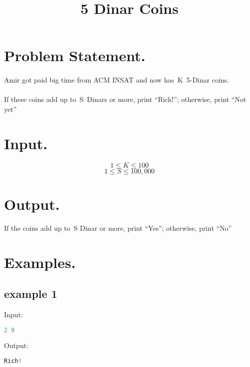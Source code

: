 \documentclass[10pt]{article}
\begin{document}
\title{5 Dinar Coins}
 \date{}
\maketitle
\section{Problem Statement.}
\paragraph{}
Amir got paid big time from ACM INSAT and now has K 5-Dinar coins.
\paragraph{}
If these coins add up to S Dinars or more, print “Rich!”; otherwise, print “Not yet”
\paragraph{}
\section{Input.}
$$ 1\le K \le 100 $$
$$ 1\le S \le 100,000 $$
\section{Output.}

If the coins add up to S Dinar or more, print “Yes”; otherwise, print “No”

\section{Examples.}
\subsection{example 1}
Input:
\begin{lstlisting}[language=Python]
2 9
\end{lstlisting}
Output:
\begin{lstlisting}[language=Python]
Rich!
\end{lstlisting}
\end{document}
